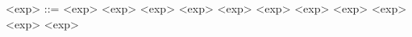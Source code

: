 \begin{grammarEx}
	<exp> ::= <exp> \lit{\opplus{}} <exp>
	\alt <exp> \lit{\opminus{}} <exp>
	\alt <exp> \lit{\opmult{}} <exp>
	\alt <exp> \lit{\opdiv{}} <exp>
	\alt <exp> \lit{\oppow{}} <exp>
	\alt <exp> \lit{\opfact{}}
	\alt {}
	\alt {}
\end{grammarEx}